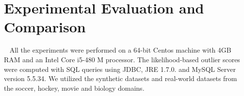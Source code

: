 {				%
				
				
				
				
				

				\section{Experimental Evaluation and Comparison}~\label{sec:Experiments}
				All the experiments were performed on a 64-bit Centos machine with 4GB RAM and an Intel Core i5-480 M processor. The likelihood-based outlier scores were computed with SQL queries using JDBC, JRE 1.7.0. and MySQL Server version 5.5.34.
				We utilized the synthetic datasets and real-world datasets from the soccer, hockey, movie and biology domains.
				
}
